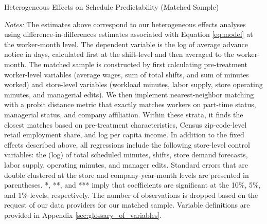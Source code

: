 \documentclass[letterpaper,11pt,leqno]{article}
\theoremstyle{paper}
\newcommand{\note}[2][]{\parbox{\textwidth}{\footnotesize\vspace*{10pt}\textit{#1}#2}}
\begin{document}
\begin{singlespace}
\begin{table}[h]
\caption{Heterogeneous Effects on Schedule Predictability (Matched Sample)}

\note{\scriptsize\textit{Notes: }The estimates above correspond to our heterogeneous effects analyses using difference-in-differences estimates associated with Equation \ref{eq:model} at the worker-month level. The dependent variable is the log of average advance notice in days, calculated first at the shift-level and then averaged to the worker-month. The matched sample is constructed by first calculating pre-treatment worker-level variables (average wages, sum of total shifts, and sum of minutes worked) and store-level variables (workload minutes, labor supply, store operating minutes, and managerial edits). We then implement nearest-neighbor matching with a probit distance metric that exactly matches workers on part-time status, managerial status, and company affiliation. Within these strata, it finds the closest matches based on pre-treatment characteristics, Census zip-code-level retail employment share, and log per capita income. In addition to the fixed effects described above, all regressions include the following store-level control variables: the (log) of total scheduled minutes, shifts, store demand forecasts, labor supply, operating minutes, and manager edits. Standard errors that are double clustered at the store and company-year-month levels are presented in parentheses. *, **, and *** imply that coefficients are significant at the 10\%, 5\%, and 1\% levels, respectively. The number of observations is dropped based on the request of our data providers for our matched sample. Variable definitions are provided in Appendix \ref{sec:glossary_of_variables}.}
\label{table:adv_notice_het_effects_matched}
\end{table}
\end{singlespace}
\end{document}
